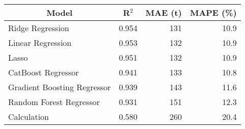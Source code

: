 
\begin{tabular}[t]{lrrr}
\toprule
\multicolumn{1}{c}{Model} & \multicolumn{1}{c}{R$^2$} & \multicolumn{1}{c}{MAE (t)} & \multicolumn{1}{c}{MAPE (\%)}\\
\midrule
Ridge Regression & 0.954 & 131 & 10.9\\
Linear Regression & 0.953 & 132 & 10.9\\
Lasso & 0.951 & 132 & 10.9\\
CatBoost Regressor & 0.941 & 133 & 10.8\\
Gradient Boosting Regressor & 0.939 & 143 & 11.6\\
Random Forest Regressor & 0.931 & 151 & 12.3\\
Calculation & 0.580 & 260 & 20.4\\
\bottomrule
\end{tabular}
